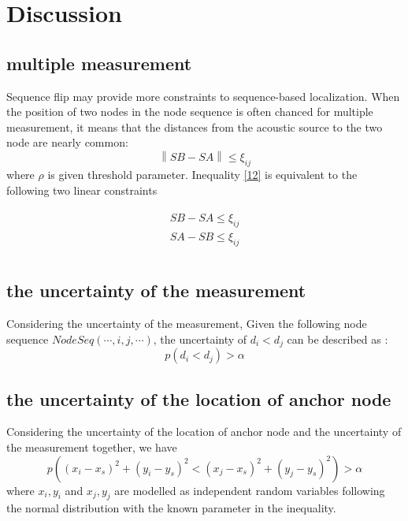 \section{Discussion}

\subsection{multiple measurement}
 Sequence flip may provide more constraints to sequence-based localization. 
 When the position of two nodes in the node sequence is often chanced for multiple measurement, 
it means that the distances from the acoustic source to the two node are nearly common:
   \begin{equation} \label{12}
 \left\| {SB - SA } \right\| \le \xi _{ij}
  \end{equation}
 where $\rho$ is given threshold parameter. Inequality \eqref{12} is equivalent to the following two linear constraints

 \begin{eqnarray} \label{13}
 \begin{array}{l}
 SB-SA \le \xi _{ij}  \\
  SA-SB \le \xi _{ij}  \\
  \end{array}
 \end{eqnarray}



 \subsection{the uncertainty of the measurement}
 Considering the uncertainty of the measurement,
 Given the following node sequence $NodeSeq( \cdots ,i,j, \cdots )$, the uncertainty of ${d_i} < {d_j}$ can be described as : 
 \begin{equation}
 p({d_i} < {d_j})>\alpha
 \end{equation}

  \subsection{the uncertainty of the location of anchor node}
 Considering the uncertainty of the location of anchor node and the uncertainty of the measurement together, we have
 \begin{equation}
 p((x_i-x_s)^2+(y_i-y_s)^2 < (x_j-x_s)^2+(y_j-y_s)^2)>\alpha
 \end{equation}
 where ${x_i,y_i}$ and ${x_j,y_j}$ are modelled as independent random variables following the normal distribution with the known parameter in the inequality.




